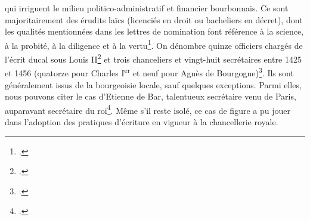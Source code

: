 qui irriguent le milieu politico-administratif et financier bourbonnais. Ce sont majoritairement des érudits laïcs (licenciés en droit ou bacheliers en décret), dont les qualités mentionnées dans les lettres de nomination font référence à la science, à la probité, à la diligence et à la vertu\footnote{\cite{matteoniEcriturePouvoirPrincier2011}.}.  On dénombre quinze officiers chargés de l'écrit ducal sous Louis II\footnote{\cite{matteoniEcriturePouvoirPrincier2011}.} et trois chanceliers et vingt-huit secrétaires entre 1425 et 1456 (quatorze pour Charles I\textsuperscript{er} et neuf pour Agnès de Bourgogne)\footnote{\cite{generoChancellerieCharlesIer2018}.}. Ils sont généralement issus de la bourgeoisie locale, sauf quelques exceptions. Parmi elles, nous pouvons citer le cas d'Etienne de Bar, talentueux secrétaire venu de Paris, auparavant secrétaire du roi\footnote{\cite{matteoniEcriturePouvoirPrincier2011}.}. Même s'il reste isolé, ce cas de figure a pu jouer dans l'adoption des pratiques d’écriture en vigueur à la chancellerie royale.
\newline 

